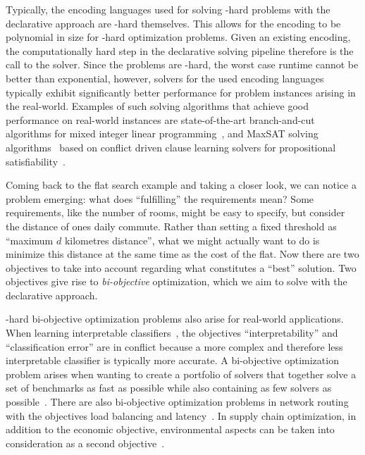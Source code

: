 Typically, the encoding languages used for solving \NP-hard problems with the declarative approach are \NP-hard themselves.
This allows for the encoding to be polynomial in size for \NP-hard optimization problems.
Given an existing encoding, the computationally hard step in the declarative solving pipeline therefore is the call to the solver.
Since the problems are \NP-hard, the worst case runtime cannot be better than exponential, however, solvers for the used encoding languages typically exhibit significantly better performance for problem instances arising in the real-world.
Examples of such solving algorithms that achieve good performance on real-world instances are state-of-the-art branch-and-cut algorithms for mixed integer linear programming~\autocite{ChenEtAl2010-branch-and-cut}, and MaxSAT solving algorithms~\autocite{handbook2-maxsat} based on conflict driven clause learning solvers for propositional satisfiability~\autocite{handbook2-cdcl}.

Coming back to the flat search example and taking a closer look, we can notice a problem emerging:
what does ``fulfilling'' the requirements mean?
Some requirements, like the number of rooms, might be easy to specify, but consider the distance of ones daily commute.
Rather than setting a fixed threshold as ``maximum $d$ kilometres distance'', what we might actually want to do is minimize this distance at the same time as the cost of the flat.
Now there are two objectives to take into account regarding what constitutes a ``best'' solution.
Two objectives give rise to \emph{bi-objective} optimization, which we aim to solve with the declarative approach.

\NP-hard bi-objective optimization problems also arise for real-world applications.
When learning interpretable classifiers~\autocites{DBLP:conf/ijcai/Ignatiev0NS21,DBLP:conf/cp/MaliotovM18,DBLP:conf/ijcai/NarodytskaIPM18,DBLP:conf/ijcai/Hu0HH20,DBLP:conf/cp/YuISB20,DBLP:conf/aaai/Ignatiev0S021,DBLP:conf/cade/IgnatievPNM18}, the objectives ``interpretability'' and ``classification error'' are in conflict because a more complex and therefore less interpretable classifier is typically more accurate.
A bi-objective optimization problem arises when wanting to create a portfolio of solvers that together solve a set of benchmarks as fast as possible while also containing as few solvers as possible~\autocite{DBLP:conf/cp/JanotaMSM21}.
There are also bi-objective optimization problems in network routing with the objectives load balancing and latency~\autocite{SilverioEtAl2022biobjectiveoptimization}.
In supply chain optimization, in addition to the economic objective, environmental aspects can be taken into consideration as a second objective~\autocites{DBLP:journals/cce/Pinto-VarelaBN11,DBLP:journals/candie/TautenhainBN19}.

